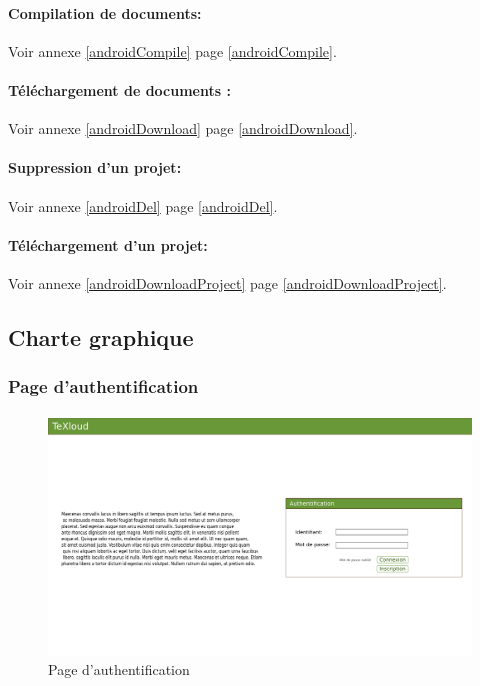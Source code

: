 \documentclass[a4paper,12pt]{article}
\begin{document}
\paragraph{Compilation de documents:\\}
Voir annexe \ref{androidCompile} page \ref{androidCompile}.

\paragraph{Téléchargement de documents :\\}
Voir annexe \ref{androidDownload} page \ref{androidDownload}.

\paragraph{Suppression d'un projet:\\}
Voir annexe \ref{androidDel} page \ref{androidDel}.

\paragraph{Téléchargement d'un projet:\\}
Voir annexe \ref{androidDownloadProject} page \ref{androidDownloadProject}.


\subsection{Charte graphique}
\subsubsection{Page d'authentification}
\paragraph{}
\begin{figure}[!ht]
\begin{center}
  \includegraphics[width=1\textwidth, angle=90]{../layout/layout_texloud_login.png}
\end{center}
  \caption{Page d'authentification}
  \label{uiAuth}
\end{figure}
\end{document}
